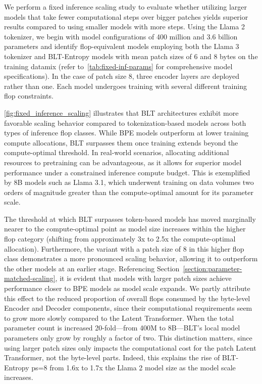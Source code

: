 We perform a fixed inference scaling study to evaluate whether utilizing larger models that take fewer computational steps over bigger patches yields superior results compared to using smaller models with more steps. Using the Llama 2 tokenizer, we begin with model configurations of 400 million and 3.6 billion parameters and identify flop-equivalent models employing both the Llama 3 tokenizer and {\textsc BLT}-Entropy models with mean patch sizes of 6 and 8 bytes on the training datamix (refer to~\autoref{tab:fixed-inf-params} for comprehensive model specifications). In the case of patch size 8, three encoder layers are deployed rather than one. Each model undergoes training with several different training flop constraints.

\autoref{fig:fixed_inference_scaling} illustrates that {\textsc BLT} architectures exhibit more favorable scaling behavior compared to tokenization-based models across both types of inference flop classes. While BPE models outperform at lower training compute allocations, {\textsc BLT} surpasses them once training extends beyond the compute-optimal threshold. In real-world scenarios, allocating additional resources to pretraining can be advantageous, as it allows for superior model performance under a constrained inference compute budget. This is exemplified by 8B models such as Llama 3.1, which underwent training on data volumes two orders of magnitude greater than the compute-optimal amount for its parameter scale.

The threshold at which {\textsc BLT} surpasses token-based models has moved marginally nearer to the compute-optimal point as model size increases within the higher flop category (shifting from approximately 3x to 2.5x the compute-optimal allocation). Furthermore, the variant with a patch size of 8 in this higher flop class demonstrates a more pronounced scaling behavior, allowing it to outperform the other models at an earlier stage. Referencing Section~\ref{section:parameter-matched-scaling}, it is evident that models with larger patch sizes achieve performance closer to BPE models as model scale expands. We partly attribute this effect to the reduced proportion of overall flops consumed by the byte-level Encoder and Decoder components, since their computational requirements seem to grow more slowly compared to the Latent Transformer. When the total parameter count is increased 20-fold—from 400M to 8B—{\textsc BLT}'s local model parameters only grow by roughly a factor of two. This distinction matters, since using larger patch sizes only impacts the computational cost for the patch Latent Transformer, not the byte-level parts. Indeed, this explains the rise of {\textsc BLT}-Entropy ps=8 from 1.6x to 1.7x the Llama 2 model size as the model scale increases.

